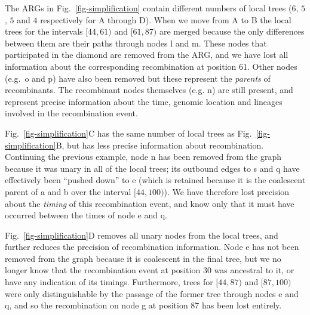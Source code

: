 \documentclass{article}
\newcommand{\noderef}[1]{\textsf{#1}}
\begin{document}
The ARGs in Fig.~\ref{fig-simplification} contain different
numbers of local trees ($6$, $5$, $5$ and $4$ respectively for A through
D). When we move from A to B the local trees
for the intervals $[44,61)$ and $[61,87)$ are merged because
the only differences between them are their paths through
nodes \noderef{l} and \noderef{m}. These nodes that participated
in the diamond are removed from the ARG, and we have lost
all information about the corresponding recombination at
position 61. Other nodes (e.g.\ \noderef{o} and \noderef{p})
have also been removed but these represent the \emph{parents}
of recombinants. The recombinant nodes themselves
(e.g. \noderef{n}) are still present, and represent precise
information about the time, genomic location and
lineages involved in the recombination event.

Fig.~\ref{fig-simplification}C has the same number of local trees
as Fig.~\ref{fig-simplification}B, but has less precise information
about recombination. Continuing the previous example, node
\noderef{n} has been removed from the graph because it was unary
in all of the local trees; its outbound edges to \noderef{s}
and \noderef{q} have effectively been ``pushed down''
to \noderef{e} (which is retained because it is the coalescent
parent of \noderef{a} and \noderef{b} over the interval
$[44, 100)$). We
have therefore lost precision about
the \emph{timing} of this recombination event, and know only
that it must have occurred between the times of node \noderef{e}
and \noderef{q}.

Fig.~\ref{fig-simplification}D removes all unary nodes from the
local trees, and further reduces the precision of
recombination information. Node \noderef{e} has not been
removed from the graph because it is coalescent in the
final tree, but we no longer know that the recombination
event at position 30 was ancestral to it, or have
any indication of its timings. Furthermore,
trees for $[44, 87)$ and $[87, 100)$ were only distinguishable
by the passage of the former tree through nodes \noderef{e}
and \noderef{q}, and so the recombination on node \noderef{g}
at position 87 has been lost entirely.
\end{document}
